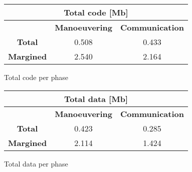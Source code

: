 \vspace*{5mm}
\begin{minipage}{0.5\linewidth}
    \centering
    \cfs{\widthtab}
    \captionsetup{type=table}
    \renewcommand{\arraystretch}{1.4}
    \begin{tabular}{|c|c|c|}
        \hline
        \multicolumn{3}{|c|}{\cellcolor{bluePoli!25}\textbf{Total code [Mb]}} \\
        \hline
        \hline
        & \textbf{Manoeuvering} & \textbf{Communication} \\
        \hline
        \textbf{Total} & 0.508 & 0.433 \\
        \hline
        \textbf{Margined} & \cellcolor{yellow!50}2.540 & 2.164 \\
        \hline
    \end{tabular}
    \caption{Total code per phase}
    \label{table:tot_code}
\end{minipage}\hfill
\begin{minipage}{0.5\linewidth}
    \centering
    \cfs{\widthtab}
    \captionsetup{type=table}
    \renewcommand{\arraystretch}{1.4}
    \begin{tabular}{|c|c|c|}
        \hline
        \multicolumn{3}{|c|}{\cellcolor{bluePoli!25}\textbf{Total data [Mb]}} \\
        \hline
        \hline
        & \textbf{Manoeuvering} & \textbf{Communication} \\
        \hline
        \textbf{Total} & 0.423 & 0.285 \\
        \hline
        \textbf{Margined} & 2.114 & 1.424 \\
        \hline
    \end{tabular}
    \caption{Total data per phase}
    \label{table:tot_data}
\end{minipage}

